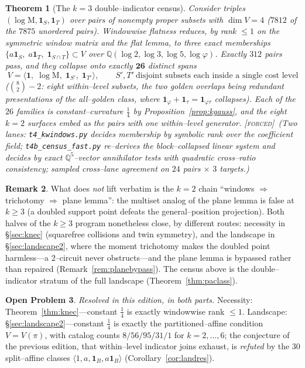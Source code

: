 \documentclass[11pt]{article}
\newtheorem{theorem}{Theorem}[section]
\theoremstyle{definition}
\newtheorem{remark}[theorem]{Remark}
\newtheorem{openproblem}[theorem]{Open Problem}
\newcommand{\ph}{\varphi}
\newcommand{\Q}{\mathbb{Q}}
\newcommand{\Mah}{\mathrm{M}}
\newcommand{\forcedtag}{{\scshape [forced]}}
\begin{document}
\begin{theorem}[The $k=3$ double--indicator census]\label{thm:kcensus}
Consider triples $(\log\Mah,\mathbf 1_S,\mathbf 1_T)$ over pairs of nonempty proper subsets with
$\dim V=4$ ($7812$ of the $7875$ unordered pairs). Windowwise flatness reduces, by rank $\le1$ on
the symmetric window matrix and the flat lemma, to three exact memberships
$\{a\mathbf 1_S,\;a\mathbf 1_T,\;\mathbf 1_{S\cap T}\}\subset V$ over $\Q(\log2,\log3,\log5,\log\ph)$.
Exactly $312$ pairs pass, and they collapse onto exactly $\mathbf{26}$ distinct spans
\[
V=\langle\mathbf 1,\;\log\Mah,\;\mathbf 1_{S'},\;\mathbf 1_{T'}\rangle,\qquad
S',T'\ \text{disjoint subsets each inside a single cost level}
\]
($\binom82-2$: eight within--level subsets, the two golden overlaps being redundant presentations
of the all--golden class, where $\mathbf 1_\ph+\mathbf 1_\tau=\mathbf 1_{\ph\tau}$ collapses). Each
of the $26$ families is constant--curvature $\tfrac14$ by Proposition~\ref{prop:kgauss}, and the
eight $k=2$ surfaces embed as the pairs with one within--level generator. \forcedtag\ (Two lanes:
\texttt{t4\_kwindows.py} decides membership by symbolic rank over the coefficient field;
\texttt{t4b\_census\_fast.py} re--derives the block--collapsed linear system and decides by exact
$\Q^5$--vector annihilator tests with quadratic cross--ratio consistency; sampled cross--lane
agreement on $24$ pairs $\times$ $3$ targets.)
\end{theorem}

\begin{remark}\label{rem:kobstruction}
What does \emph{not} lift verbatim is the $k=2$ chain ``windows $\Rightarrow$ trichotomy
$\Rightarrow$ plane lemma'': the multiset analog of the plane lemma is false at $k\ge3$ (a doubled
support point defeats the general--position projection). Both halves of the $k\ge3$ program
nonetheless close, by different routes: necessity in \S\ref{sec:knec} (squarefree collisions and
twin symmetry), and the landscape in \S\ref{sec:landscape2}, where the moment trichotomy makes
the doubled point harmless---a $2$--circuit never obstructs---and the plane lemma is bypassed
rather than repaired (Remark~\ref{rem:planebypass}). The census above is the double--indicator
stratum of the full landscape (Theorem~\ref{thm:paclass}).
\end{remark}

\begin{openproblem}\label{op:kclass}
\emph{Resolved in this edition, in both parts.} Necessity: Theorem~\ref{thm:knec}---constant
$\tfrac14$ is exactly windowwise rank $\le1$. Landscape: \S\ref{sec:landscape2}---constant
$\tfrac14$ is exactly the partitioned--affine condition $V=V(\pi)$, with catalog counts
$8/56/95/31/1$ for $k=2,\dots,6$; the conjecture of the previous edition, that within--level
indicator joins exhaust, is \emph{refuted} by the $30$ split--affine classes
$\langle1,a,\mathbf 1_B,a\mathbf 1_B\rangle$ (Corollary~\ref{cor:landres}).
\end{openproblem}
\end{document}
